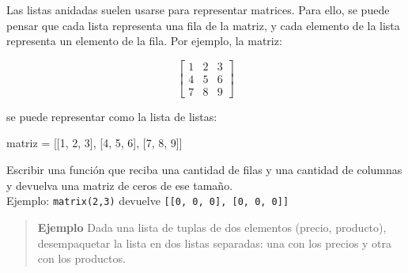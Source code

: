 \documentclass[
  letterpaper,
  DIV=11,
  numbers=noendperiod]{scrreprt}
\newenvironment{Shaded}{\begin{snugshade}}{\end{snugshade}}
\newcommand{\DecValTok}[1]{\textcolor[rgb]{0.68,0.00,0.00}{#1}}
\newcommand{\NormalTok}[1]{\textcolor[rgb]{0.00,0.23,0.31}{#1}}
\newcommand{\OperatorTok}[1]{\textcolor[rgb]{0.37,0.37,0.37}{#1}}
\begin{document}
Las listas anidadas suelen usarse para representar matrices. Para ello,
se puede pensar que cada lista representa una fila de la matriz, y cada
elemento de la lista representa un elemento de la fila. Por ejemplo, la
matriz:

\[
\begin{bmatrix}
1 & 2 & 3 \\
4 & 5 & 6 \\
7 & 8 & 9
\end{bmatrix}
\]

se puede representar como la lista de listas:

\begin{Shaded}
\begin{Highlighting}[]
\NormalTok{matriz }\OperatorTok{=}\NormalTok{ [[}\DecValTok{1}\NormalTok{, }\DecValTok{2}\NormalTok{, }\DecValTok{3}\NormalTok{], [}\DecValTok{4}\NormalTok{, }\DecValTok{5}\NormalTok{, }\DecValTok{6}\NormalTok{], [}\DecValTok{7}\NormalTok{, }\DecValTok{8}\NormalTok{, }\DecValTok{9}\NormalTok{]]}
\end{Highlighting}
\end{Shaded}

\begin{tcolorbox}[enhanced jigsaw, arc=.35mm, toptitle=1mm, colframe=quarto-callout-important-color-frame, bottomtitle=1mm, opacitybacktitle=0.6, colbacktitle=quarto-callout-important-color!10!white, leftrule=.75mm, coltitle=black, toprule=.15mm, titlerule=0mm, title=\textcolor{quarto-callout-important-color}{\faExclamation}\hspace{0.5em}{Ejercicio Desafío}, bottomrule=.15mm, rightrule=.15mm, colback=white, breakable, opacityback=0, left=2mm]

Escribir una función que reciba una cantidad de filas y una cantidad de
columnas y devuelva una matriz de ceros de ese tamaño.\\
Ejemplo: \texttt{matrix(2,3)} devuelve
\texttt{{[}{[}0,\ 0,\ 0{]},\ {[}0,\ 0,\ 0{]}{]}}

\end{tcolorbox}

\hfill\break

\begin{quote}
\textbf{Ejemplo} Dada una lista de tuplas de dos elementos (precio,
producto), desempaquetar la lista en dos listas separadas: una con los
precios y otra con los productos.
\end{quote}
\end{document}
